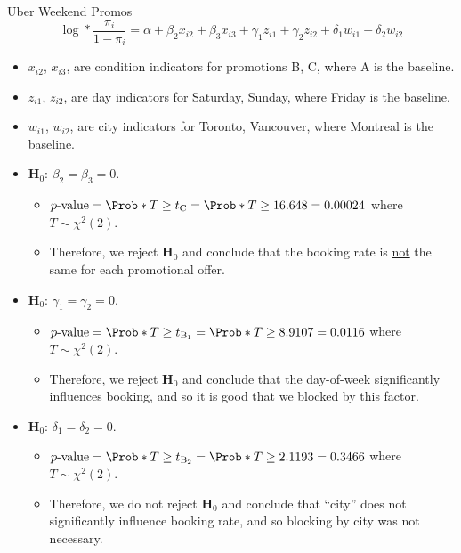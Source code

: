 \begin{Example}{Uber Weekend Promos}{}
      \[ \log*{\frac{\pi_i}{1-\pi_i}}=\alpha+\beta_2 x_{i2}+\beta_3 x_{i3}+\gamma_1 z_{i1}+\gamma_2 z_{i2}+\delta_1 w_{i1}+\delta_2 w_{i2} \]
      \begin{itemize}
            \item $ x_{i2} $, $ x_{i3} $, are condition indicators for promotions B, C, where A is the baseline.
            \item $ z_{i1} $, $ z_{i2} $, are day indicators for Saturday, Sunday, where Friday is the baseline.
            \item $ w_{i1} $, $ w_{i2} $, are city indicators for Toronto, Vancouver, where Montreal is the baseline.
      \end{itemize}
      \begin{itemize}
            \item $ \mathbf{H}_0 $: $ \beta_2=\beta_3=0 $.
                  \begin{itemize}
                        \item $ p\text{-value}=\Prob*{T\ge t_\text{C}}=\Prob*{T\ge 16.648}=0.00024 $ where $ T \sim \chi^2(2) $.
                        \item Therefore, we reject $ \mathbf{H}_0 $ and conclude that the booking rate is \underline{not} the same
                              for each promotional offer.
                  \end{itemize}
            \item $ \mathbf{H}_0 $: $ \gamma_1=\gamma_2=0 $.
                  \begin{itemize}
                        \item $ p\text{-value}=\Prob*{T\ge t_{\text{B}_1}}=\Prob*{T\ge 8.9107}=0.0116 $ where $ T \sim \chi^2(2) $.
                        \item Therefore, we reject $ \mathbf{H}_0 $ and conclude that the day-of-week significantly influences booking, and so it is good that we blocked by this factor.
                  \end{itemize}
            \item $ \mathbf{H}_0 $: $ \delta_1=\delta_2=0 $.
                  \begin{itemize}
                        \item $ p\text{-value}=\Prob*{T\ge t_{\text{B}_2}}=\Prob*{T\ge 2.1193}=0.3466 $ where $ T \sim \chi^2(2) $.
                        \item Therefore, we do not reject $ \mathbf{H}_0 $ and conclude that ``city'' does not significantly influence booking rate, and so blocking by city was not necessary.
                  \end{itemize}
      \end{itemize}

\end{Example}
